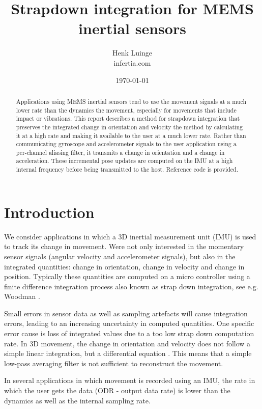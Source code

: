 \documentclass{article}
\title{Strapdown integration for MEMS inertial sensors}
\author{Henk Luinge  \\
	infertia.com   \\
	}
\date{\today}
\begin{document}
\maketitle

\begin{abstract}
Applications using MEMS inertial sensors tend to use the movement signals at a much lower rate than the dynamics the movement, especially for movements that include impact or vibrations. This report describes a method for strapdown integration that preserves the integrated change in orientation and velocity the method by calculating it at a high rate and making it available to the user at a much lower rate. Rather than communicating gyroscope and accelerometer signals to the user application using a per-channel aliasing filter, it transmits a change in orientation and a change in acceleration. These incremental pose updates are computed on the IMU at a high internal frequency before being transmitted to the host. Reference code is provided.
\end{abstract}

\section{Introduction}


We consider applications in which a 3D inertial measurement unit (IMU) is used to track its change in movement. Were not only interested in the momentary sensor signals (angular velocity and accelerometer signals), but also in the integrated quantities: change in orientation, change in velocity and change in position. Typically these quantities are computed on a micro controller using a finite difference integration process also known as strap down integration, see e.g. Woodman \cite{Woodman2007}.

Small errors in sensor data as well as sampling artefacts will cause integration errors, leading to an increasing uncertainty in computed quantities. One specific error cause is loss of integrated values due to a too low strap down computation rate. In 3D movement, the change in orientation and velocity does not follow a simple linear integration, but a differential equation \cite{Bortz1970}. This means that a simple low-pass averaging filter is not sufficient to reconstruct the movement. 

In several applications in which movement is recorded using an IMU, the rate in which the user gets the data (ODR - output data rate) is lower than the dynamics as well as the internal sampling rate. 
\end{document}
